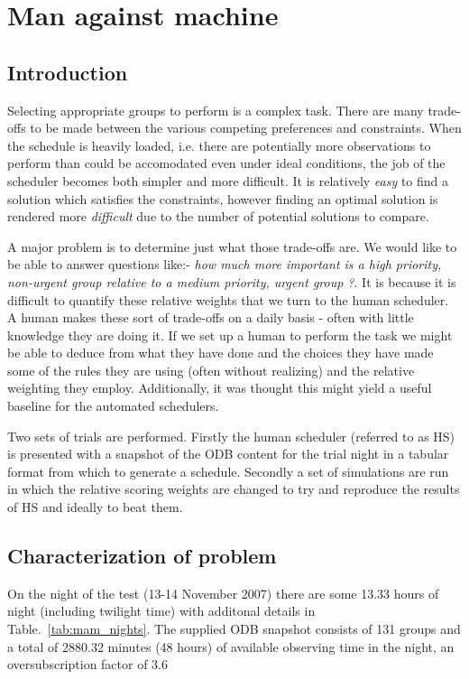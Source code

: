 \section{Man against machine}
\label{sect:mam_study}
\subsection{Introduction}
Selecting appropriate groups to perform is a complex task. There are many trade-offs to be made between the various competing preferences and constraints. When the schedule is heavily loaded, i.e. there are potentially more observations to perform than could be accomodated even under ideal conditions, the job of the scheduler becomes both simpler and more difficult. It is relatively \emph{easy} to find a solution which satisfies the constraints, however finding an optimal solution is rendered more \emph{difficult} due to the number of potential solutions to compare. 

A major problem is to determine just what those trade-offs are. We would like to be able to answer questions like:- \emph{how much more important is a high priority, non-urgent group relative to a medium priority, urgent group ?}. It is because it is difficult to quantify these relative weights that we turn to the human scheduler. A human makes these sort of trade-offs on a daily basis - often with little knowledge they are doing it. If we set up a human to perform the task we might be able to deduce from what they have done and the choices they have made some of the rules they are using (often without realizing) and the relative weighting they employ. Additionally, it was thought this might yield a useful baseline for the automated schedulers.

Two sets of trials are performed. Firstly the human scheduler (referred to as HS) is presented with a snapshot of the ODB content for the trial night in a tabular format  from which to generate a schedule. Secondly a set of simulations are run in which the relative scoring weights are changed to try and reproduce the results of HS and ideally to beat them.

\subsection{Characterization of problem}
On the night of the test (13-14 November 2007) there are some 13.33 hours of night (including twilight time) with additonal details in Table.~\ref{tab:mam_nights}.
The supplied ODB snapshot consists of 131 groups and a total of 2880.32 minutes (48 hours) of available observing time in the night, an oversubscription factor of 3.6


